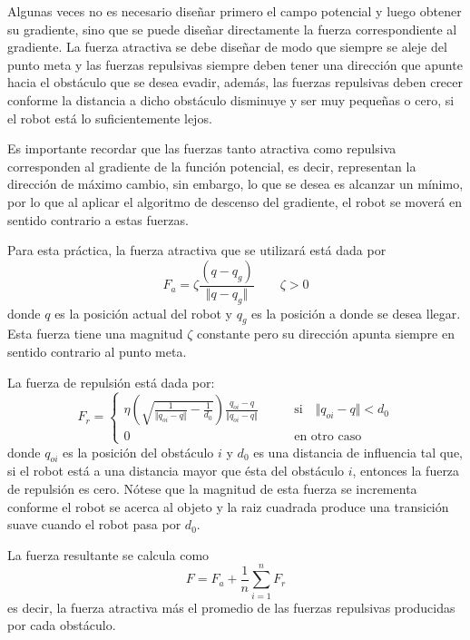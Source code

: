 \documentclass[letterpaper,12pt]{article}
\newcommand\ddfrac[2]{\frac{\displaystyle #1}{\displaystyle #2}}
\begin{document}
Algunas veces no es necesario diseñar primero el campo potencial y luego obtener su gradiente, sino que se puede diseñar directamente la fuerza correspondiente al gradiente. La fuerza atractiva se debe diseñar de modo que siempre se aleje del punto meta y las fuerzas repulsivas siempre deben tener una dirección que apunte hacia el obstáculo que se desea evadir, además, las fuerzas repulsivas deben crecer conforme la distancia a dicho obstáculo disminuye y ser muy pequeñas o cero, si el robot está lo suficientemente lejos. 

Es importante recordar que las fuerzas tanto atractiva como repulsiva corresponden al gradiente de la función potencial, es decir, representan la dirección de máximo cambio, sin embargo, lo que se desea es alcanzar un mínimo, por lo que al aplicar el algoritmo de descenso del gradiente, el robot se moverá en sentido contrario a estas fuerzas. 

Para esta práctica, la fuerza atractiva que se utilizará está dada por
\begin{equation}
  \label{eq:attractive}
  F_a = \zeta \ddfrac{\left(q - q_g\right) }{\Vert q - q_g \Vert}\qquad \zeta > 0
\end{equation}
donde $q$ es la posición actual del robot y $q_g$ es la posición a donde se desea llegar. Esta fuerza tiene una magnitud $\zeta$ constante pero su dirección apunta siempre en sentido contrario al punto meta. 

La fuerza de repulsión está dada por:
\begin{equation}
  \label{eq:repulsive}
  F_r = \begin{cases}
    \eta\left(\sqrt{\frac{1}{\Vert q_{oi} - q\Vert} - \frac{1}{d_0}}\right)\ddfrac{q_{oi} - q}{\Vert q_{oi} - q\Vert}
    & \qquad\textrm{si}\quad \Vert q_{oi} - q\Vert < d_0\\
    0 & \qquad\textrm{en otro caso}
  \end{cases}
\end{equation}
donde $q_{oi}$ es la posición del obstáculo $i$ y $d_0$ es una distancia de influencia tal que, si el robot está a una distancia mayor que ésta del obstáculo $i$, entonces la fuerza de repulsión es cero. Nótese que la magnitud de esta fuerza se incrementa conforme el robot se acerca al objeto y la raiz cuadrada produce una transición suave cuando el robot pasa por $d_0$.

La fuerza resultante se calcula como 
\begin{equation}
  \label{eq:resulting}
  F = F_a + \frac{1}{n}\sum_{i=1}^n F_r
\end{equation}
es decir, la fuerza atractiva más el promedio de las fuerzas repulsivas producidas por cada obstáculo.
\end{document}
